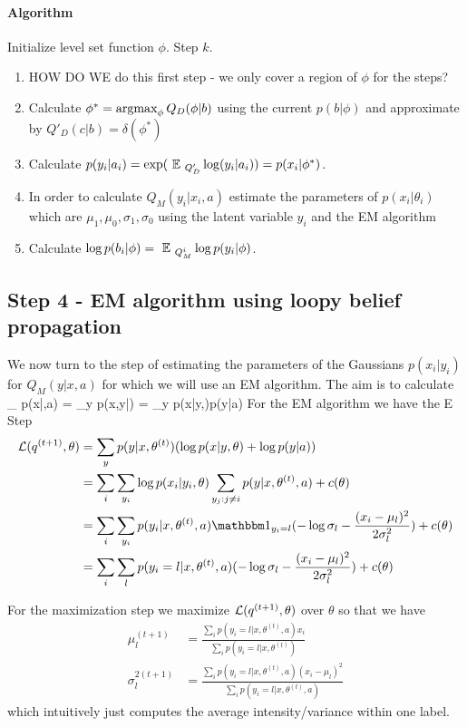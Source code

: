 \documentclass{article} %
\begin{document}
\paragraph{Algorithm}
Initialize level set function $\phi$.
Step $k$.
\begin{enumerate}
\item HOW DO WE do this first step - we only cover a region of $\phi$ for the steps?
\item Calculate $\phi^* = \operatorname*{argmax}_{\phi} Q_D(\phi|b)$ using the current $p(b|\phi)$ and approximate by $Q'_D(c|b) = \delta(\phi^*)$
\item Calculate $p(y_i|a_i) = \exp(\mbox{ }\mathbb{E}\mbox{ }_{Q'_D} \log (y_i|a_i))= p(x_i|\phi^*)$.
\item In order to calculate $Q_M(y_i|x_i,a)$ estimate the parameters of $p(x_i|\theta_i)$ which are $\mu_1,\mu_0,\sigma_1,\sigma_0$ using the latent variable $y_i$ and the EM algorithm
\item Calculate $\log p(b_i|\phi) = \mbox{ }\mathbb{E}\mbox{ }_{Q_M^i} \log p(y_i|\phi)$.
\end{enumerate} 

\subsection{Step 4 - EM algorithm using loopy belief propagation}
We now turn to the step of estimating the parameters of the Gaussians $p(x_i|y_i)$ for $Q_M(y|x,a)$ for which we will use an EM algorithm. The aim is to calculate 
\beqs
\max_{\theta} p(x|\theta,a) = \sum_y p(x,y|\theta) = \sum_y p(x|y,\theta)p(y|a)
\eeqs
For the EM algorithm we have the E Step
\begin{align*}
\L(q^{(t+1)},\theta) &= \sum_y p(y|x,\theta^{(t)}) (\log p(x|y,\theta) + \log p(y|a)) \\
&= \sum_i \sum_{y_i} \log p(x_i|y_i,\theta) \sum_{y_j:j\neq i} p(y|x,\theta^{(t)},a) + c(\theta)\\
&= \sum_i \sum_{y_i} p(y_i|x, \theta^{(t)},a) \Indi_{y_i=l} (-\log \sigma_l - \frac{(x_i -\mu_l)^2}{2\sigma_l^2}) + c(\theta)\\
&= \sum_i \sum_l p(y_i = l|x,\theta^{(t)},a) (-\log \sigma_l -  \frac{(x_i -\mu_l)^2}{2\sigma_l^2}) + c(\theta)
\end{align*}

For the maximization step we maximize $\mathcal{L}(q^{(t+1)},\theta)$ over $\theta$ so that we have
\begin{align*}
\mu_l^{(t+1)} &= \frac{\sum_i p(y_i=l|x,\theta^{(t)},a) x_i}{\sum_i p(y_i=l|x,\theta^{(t)})}\\
\sigma_l^{2(t+1)} &= \frac{\sum_i p(y_i =l | x,\theta^{(t)},a)(x_i-\mu_l)^2}{\sum_i p(y_i = l|x,\theta^{(t)},a)}
\end{align*}
which intuitively just computes the average intensity/variance within one label.
\end{document}
